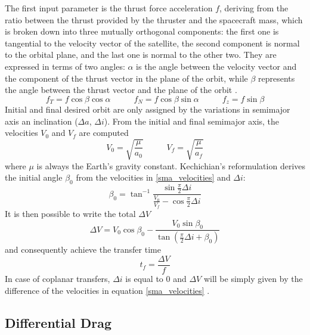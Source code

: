 The first input parameter is the thrust force acceleration $f$, deriving from the ratio between the thrust provided by the thruster and the spacecraft mass, which is broken down into three mutually orthogonal components:
the first one is tangential to the velocity vector of the satellite, the second component is normal to the orbital plane, and the last one is normal to the other two.
They are expressed in terms of two angles: 
$\alpha$ is the angle between the velocity vector and the component of the thrust vector in the plane of the orbit,
while $\beta$ represents the angle between the thrust vector and the plane of the orbit \cite{edelbaum1961propulsion}.
\begin{equation} \label{acceleration_thrust_components}
    f_T = f \cos{\beta} \cos{\alpha} \;\;\;\;\;\;\;\;\;\; f_N = f \cos{\beta} \sin{\alpha} \;\;\;\;\;\;\;\;\;\; f_z = f \sin{\beta}
\end{equation}
Initial and final desired orbit are only assigned by the variations in semimajor axis an inclination ($\Delta a$, $\Delta i$).
From the initial and final semimajor axis, the velocities $V_0$ and $V_f$ are computed 
\begin{equation} \label{sma_velocities}
    V_0 = \sqrt{\frac{\mu}{a_0}} \;\;\;\;\;\;\;\;\;\; V_f = \sqrt{\frac{\mu}{a_f}}
\end{equation}
where $\mu$ is always the Earth's gravity constant.
Kechichian's reformulation derives the initial angle $\beta_0$ from the velocities in \ref{sma_velocities} and $\Delta i$:
\begin{equation} \label{beta0}
    \beta_0 = \tan^{-1}{\frac{\sin{\frac{\pi}{2}}\Delta i}{\frac{V_0}{V_f} - \cos{\frac{\pi}{2}}\Delta i}}
\end{equation}
It is then possible to write the total $\Delta V$
\begin{equation} \label{deltaV}
    \Delta V = V_0 \cos{\beta_0} - \frac{V_0 \sin{\beta_0}}{\tan{\left(\frac{\pi}{2}\Delta i + \beta_0\right)}}
\end{equation}
and consequently achieve the transfer time
\begin{equation} \label{transfer_time}
    t_f = \frac{\Delta V}{f}
\end{equation}
In case of coplanar transfers, $\Delta i$ is equal to 0 and $\Delta V$ will be simply given by the difference of the velocities in equation \ref{sma_velocities} \cite{kechichian1992reformulation}.

\subsection{Differential Drag}


